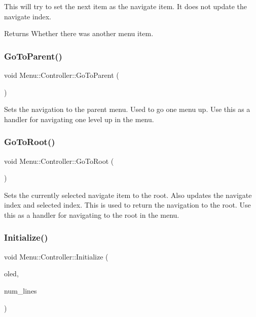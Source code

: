 This will try to set the next item as the navigate item. It does not update the navigate index. \begin{DoxyReturn}{Returns}
Whether there was another menu item. 
\end{DoxyReturn}
\hypertarget{class_menu_1_1_controller_ab30a038c4e4e3cb102d419c11a6813f6}{}\label{class_menu_1_1_controller_ab30a038c4e4e3cb102d419c11a6813f6} 
\subsubsection{\texorpdfstring{Go\+To\+Parent()}{GoToParent()}}
{\footnotesize\ttfamily void Menu\+::\+Controller\+::\+Go\+To\+Parent (\begin{DoxyParamCaption}{ }\end{DoxyParamCaption})}

Sets the navigation to the parent menu. Used to go one menu up. Use this as a handler for navigating one level up in the menu. \hypertarget{class_menu_1_1_controller_a787911ef46ca1968c2fd667af1f9ac27}{}\label{class_menu_1_1_controller_a787911ef46ca1968c2fd667af1f9ac27} 
\subsubsection{\texorpdfstring{Go\+To\+Root()}{GoToRoot()}}
{\footnotesize\ttfamily void Menu\+::\+Controller\+::\+Go\+To\+Root (\begin{DoxyParamCaption}{ }\end{DoxyParamCaption})}

Sets the currently selected navigate item to the root. Also updates the navigate index and selected index. This is used to return the navigation to the root. Use this as a handler for navigating to the root in the menu. \hypertarget{class_menu_1_1_controller_a9cf59f4581c2f1943bde424060476c40}{}\label{class_menu_1_1_controller_a9cf59f4581c2f1943bde424060476c40} 
\subsubsection{\texorpdfstring{Initialize()}{Initialize()}}
{\footnotesize\ttfamily void Menu\+::\+Controller\+::\+Initialize (\begin{DoxyParamCaption}\item[{\hyperlink{class_o_l_e_d}{O\+L\+ED} \&}]{oled,  }\item[{uint8\+\_\+t}]{num\+\_\+lines }\end{DoxyParamCaption})}

